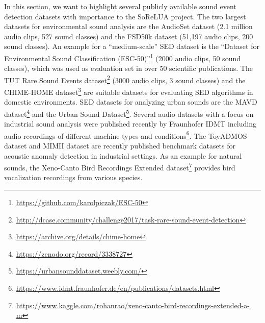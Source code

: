 \documentclass[11pt]{article}
\begin{document}
In this section, we want to highlight several publicly available sound event detection datasets with importance to the SoReLUA project. 
The two largest datasets for environmental sound analysis are the AudioSet dataset \cite{Gemmeke:2017:Audioset:ICASSP} (2.1 million audio clips, 527 sound classes) and the FSD50k dataset \cite{Fonseca:2020:FSD50K:ARXIV} (51,197 audio clips, 200 sound classes).
An example for a ``medium-scale'' SED dataset is the  ``Dataset for Environmental Sound Classification (ESC-50)''\footnote{\url{https://github.com/karolpiczak/ESC-50}} (2000 audio clips, 50 sound classes), which was used as evaluation set in over 50 scientific publications.
The TUT Rare Sound Events dataset\footnote{\url{http://dcase.community/challenge2017/task-rare-sound-event-detection}} (3000 audio clips, 3 sound classes) 
and the CHIME-HOME dataset\footnote{\url{https://archive.org/details/chime-home}} 
are suitable datasets for evaluating SED algorithms in domestic environments.
SED datasets for analyzing urban sounds are the MAVD dataset\footnote{\url{https://zenodo.org/record/3338727}} and the Urban Sound Dataset\footnote{\url{https://urbansounddataset.weebly.com/}}. Several audio datasets with a focus on industrial sound analysis were published recently by Fraunhofer IDMT 
including audio recordings of different machine types and conditions\footnote{\url{https://www.idmt.fraunhofer.de/en/publications/datasets.html}}.
The ToyADMOS dataset \cite{Koizumi2019d} and MIMII dataset \cite{Purohit2019a} are recently published benchmark datasets for acoustic anomaly detection in industrial settings. 
As an example for natural sounds, the Xeno-Canto Bird Recordings Extended dataset\footnote{\url{https://www.kaggle.com/rohanrao/xeno-canto-bird-recordings-extended-a-m}} provides bird vocalization recordings from various species.
\end{document}
